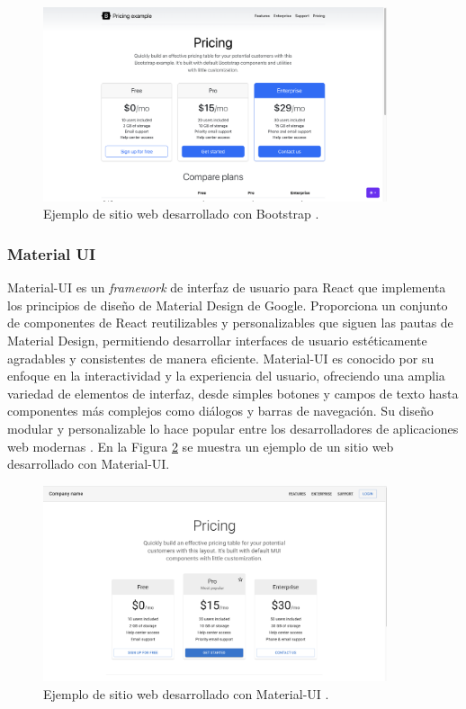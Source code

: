 \begin{figure}[!htbp]
  \centering
  \includegraphics[width=0.9\textwidth]{imagenes/02-marco-teorico/bootstrap-demo.png}
  \caption[Ejemplo de sitio web desarrollado con Bootstrap]{Ejemplo de sitio web desarrollado con Bootstrap \cite{bootstrap_official}.}
  \label{fig:bootstrap-demo}
\end{figure}

\subsubsection{Material UI}
Material-UI es un \textit{framework} de interfaz de usuario para React que implementa
los principios de diseño de Material Design de Google. Proporciona un conjunto
de componentes de React reutilizables y personalizables que siguen las pautas de
Material Design, permitiendo desarrollar interfaces de usuario estéticamente
agradables y consistentes de manera eficiente. Material-UI es conocido por su
enfoque en la interactividad y la experiencia del usuario, ofreciendo una amplia
variedad de elementos de interfaz, desde simples botones y campos de texto hasta
componentes más complejos como diálogos y barras de navegación. Su diseño modular
y personalizable lo hace popular entre los desarrolladores de aplicaciones web
modernas \cite{mui_getting_started}. En la Figura \ref{fig:material-ui-demo} se
muestra un ejemplo de un sitio web desarrollado con Material-UI.

\begin{figure}[!htbp]
  \centering
  \includegraphics[width=0.9\textwidth]{imagenes/02-marco-teorico/material-ui-demo.png}
  \caption[Ejemplo de sitio web desarrollado con Material-UI]{Ejemplo de sitio web desarrollado con Material-UI \cite{mui_getting_started}.}
  \label{fig:material-ui-demo}
\end{figure}


